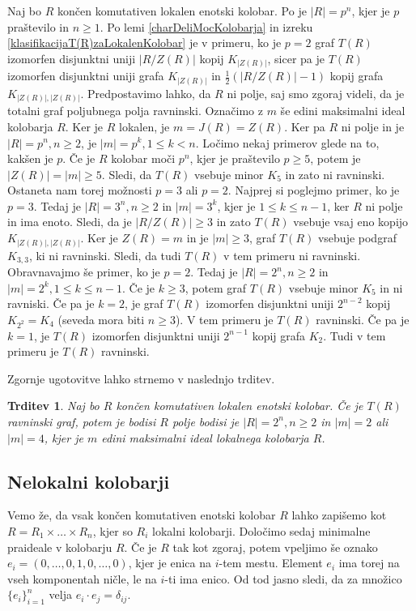 \documentclass[a4paper, 12pt]{amsart}
\theoremstyle{definition} %
\theoremstyle{plain} %
\newtheorem{trditev}[definicija]{Trditev}
\begin{document}
Naj bo $R$ končen komutativen lokalen enotski kolobar. Po \cite[Posledica 2.4]{diploma} je $|R| = p^n$, kjer je $p$ praštevilo in $n\ge 1$. Po lemi \ref{charDeliMocKolobarja} in izreku \ref{klasifikacijaT(R)zaLokalenKolobar} je v primeru, ko je $p=2$ graf $T(R)$ izomorfen disjunktni uniji $|R/Z(R)|$ kopij $K_{|Z(R)|}$, sicer pa je $T(R)$ izomorfen disjunktni uniji grafa $K_{|Z(R)|}$ in $\frac{1}{2}(|R/Z(R)| - 1)$ kopij grafa $K_{|Z(R)|,|Z(R)|}$.
Predpostavimo lahko, da $R$ ni polje, saj smo zgoraj videli, da je totalni graf poljubnega polja ravninski. Označimo z $m$ še edini maksimalni ideal kolobarja $R$. Ker je $R$ lokalen, je $m=J(R) = Z(R)$. Ker pa $R$ ni polje in je $|R|=p^n, n \ge 2$, je  $|m| = p^k, 1\le k < n$. Ločimo nekaj primerov glede na to, kakšen je $p$. Če je $R$ kolobar moči $p ^n$, kjer je praštevilo $p\ge5$, potem je $|Z(R)| = |m| \ge 5$. Sledi, da $T(R)$ vsebuje minor $K_5$ in  zato ni ravninski. Ostaneta nam torej možnosti $p=3$ ali $p=2$. Najprej si poglejmo primer, ko je $p=3$. Tedaj je $|R|= 3^n, n\ge  2$ in $|m| = 3^k$, kjer je $1\le k \le n-1$, ker $R$ ni polje in ima enoto. Sledi, da je $|R/Z(R)| \ge 3$ in zato $T(R)$ vsebuje vsaj eno kopijo $K_{|Z(R)|,|Z(R)|}$. Ker je $Z(R)= m$ in je $|m| \ge 3$, graf $T(R)$ vsebuje podgraf $K_{3,3}$, ki ni ravninski. Sledi, da tudi $T(R)$ v tem primeru ni ravninski. Obravnavajmo še primer, ko je $p=2$. Tedaj je $|R| = 2^n, n\ge 2$ in $|m| = 2^k, 1 \le k \le n-1$. Če je $k\ge 3$, potem graf $T(R)$ vsebuje minor $K_5$ in ni ravniski. Če pa je $k=2$, je graf $T(R)$ izomorfen disjunktni uniji $2^{n-2}$ kopij $K_{2^2} = K_4$ (seveda mora biti $n\ge 3$). V tem primeru je $T(R)$ ravninski. Če pa je $k=1$, je $T(R)$ izomorfen disjunktni uniji $2^{n-1}$ kopij grafa $K_2$. Tudi v tem primeru je $T(R)$ ravninski. 

Zgornje ugotovitve lahko strnemo v naslednjo trditev.

\begin{trditev}
Naj bo $R$ končen komutativen lokalen enotski kolobar. Če je $T(R)$ ravninski graf, potem je bodisi $R$ polje bodisi je $|R| = 2^n, n\ge 2$ in $|m| = 2$ ali $|m| = 4$, kjer je $m$ edini maksimalni ideal lokalnega kolobarja $R$.
\end{trditev}

\subsection{Nelokalni kolobarji}

Vemo že, da vsak končen komutativen enotski kolobar $R$ lahko zapišemo kot $R= R_1 \times \dots \times R_n$, kjer so $R_i$ lokalni kolobarji. Določimo sedaj minimalne praideale v kolobarju $R$. Če je $R$ tak kot zgoraj, potem vpeljimo še oznako $e_i = (0,\dots,0,1,0,\dots,0)$, kjer je enica na $i$-tem mestu. Element $e_i$ ima torej na vseh komponentah ničle, le na $i$-ti ima enico. Od tod jasno sledi, da za množico $\{e_i\}_{i=1}^n$ velja $e_i \cdot e_j = \delta_{ij}$.
\end{document}
